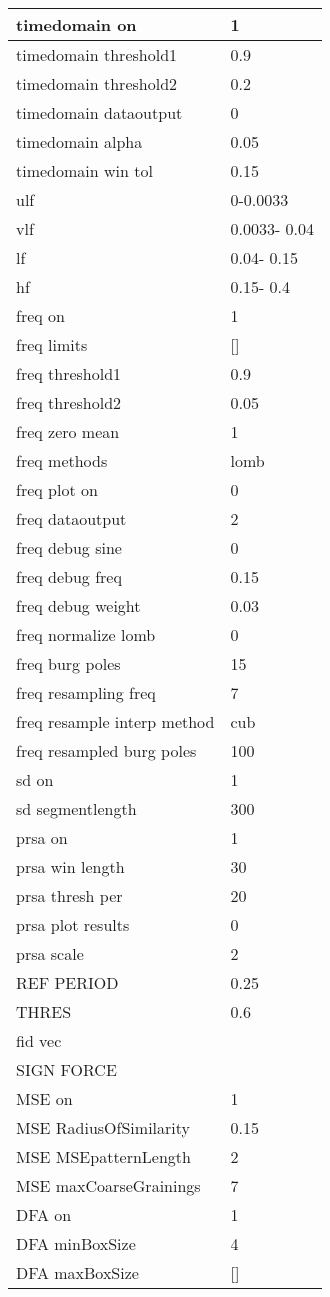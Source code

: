 \begin{tabular}{|l|l|}
timedomain on&1\\\hline
timedomain threshold1&0.9\\\hline
timedomain threshold2&0.2\\\hline
timedomain dataoutput&0\\\hline
timedomain alpha&0.05\\\hline
timedomain win tol&0.15\\\hline
ulf&     0-0.0033\\\hline
vlf&0.0033-  0.04\\\hline
lf&  0.04-  0.15\\\hline
hf&  0.15-   0.4\\\hline
freq on&1\\\hline
freq limits&[]\\\hline
freq threshold1&0.9\\\hline
freq threshold2&0.05\\\hline
freq zero mean&1\\\hline
freq methods&lomb\\\hline
freq plot on&0\\\hline
freq dataoutput&2\\\hline
freq debug sine&0\\\hline
freq debug freq&0.15\\\hline
freq debug weight&0.03\\\hline
freq normalize lomb&0\\\hline
freq burg poles&15\\\hline
freq resampling freq&7\\\hline
freq resample interp method&cub\\\hline
freq resampled burg poles&100\\\hline
sd on&1\\\hline
sd segmentlength&300\\\hline
prsa on&1\\\hline
prsa win length&30\\\hline
prsa thresh per&20\\\hline
prsa plot results&0\\\hline
prsa scale&2\\\hline
REF PERIOD&0.25\\\hline
THRES&0.6\\\hline
fid vec&\\\hline
SIGN FORCE&\\\hline
MSE on&1\\\hline
MSE RadiusOfSimilarity&0.15\\\hline
MSE MSEpatternLength&2\\\hline
MSE maxCoarseGrainings&7\\\hline
DFA on&1\\\hline
DFA minBoxSize&4\\\hline
DFA maxBoxSize&[]\\\hline
\end{tabular}
